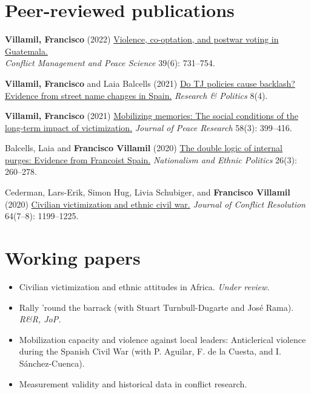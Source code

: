 \documentclass[a4paper, 12pt]{article}
\begin{document}
\section*{Peer-reviewed publications}

\begin{etaremune}[leftmargin=12pt, itemsep=0pt]
\item \textbf{Villamil, Francisco} (2022) \href{https://journals.sagepub.com/doi/full/10.1177/07388942211066539}{Violence, co-optation, and postwar voting in Guatemala.}\\\textit{Conflict Management and Peace Science} 39(6): 731--754.
\item \textbf{Villamil, Francisco} and Laia Balcells (2021) \href{https://journals.sagepub.com/doi/full/10.1177/20531680211058550}{Do TJ policies cause backlash? Evidence from street name changes in Spain.} \textit{Research \& Politics} 8(4).
\item \textbf{Villamil, Francisco} (2021) \href{https://doi.org/10.1177/0022343320912816}{Mobilizing memories: The social conditions of the long-term impact of victimization.} \textit{Journal of Peace Research} 58(3): 399--416.
\item Balcells, Laia and \textbf{Francisco Villamil} (2020) \href{https://doi.org/10.1080/13537113.2020.1795451}{The double logic of internal purges: Evidence from Francoist Spain.} \textit{Nationalism and Ethnic Politics} 26(3): 260--278.
\item Cederman, Lars-Erik, Simon Hug, Livia Schubiger, and \textbf{Francisco Villamil} (2020) \href{https://doi.org/10.1177/0022002719898873}{Civilian victimization and ethnic civil war.} \textit{Journal of Conflict Resolution} 64(7--8): 1199--1225.
\end{etaremune}

\clearpage
\section*{Working papers}

\begin{itemize}[leftmargin=*, nolistsep]
\item Civilian victimization and ethnic attitudes in Africa. \textit{Under review.}
\item Rally 'round the barrack (with Stuart Turnbull-Dugarte and José Rama). \textit{R\&R, JoP.}
\item Mobilization capacity and violence against local leaders: Anticlerical violence during the Spanish Civil War (with P. Aguilar, F. de la Cuesta, and I. Sánchez-Cuenca).
\item Measurement validity and historical data in conflict research.
\end{itemize}
\end{document}
